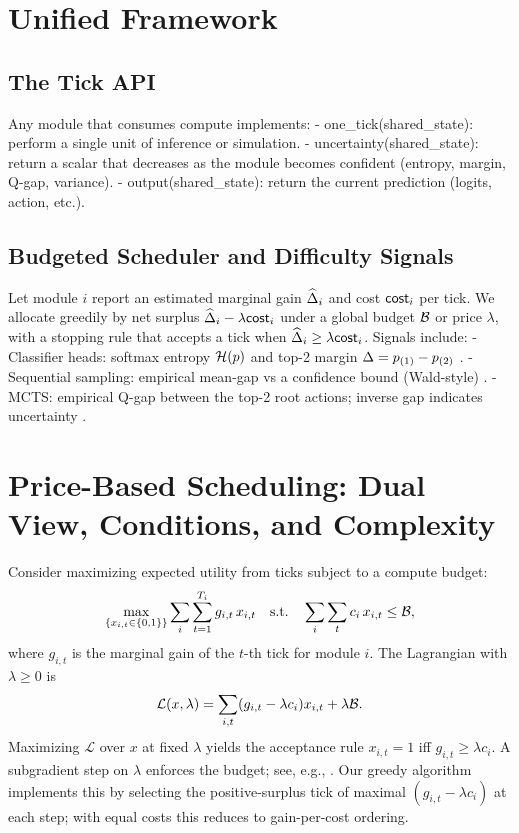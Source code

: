 \section{Unified Framework}
\label{sec:framework}
\subsection{The Tick API}
Any module that consumes compute implements:
- one\_tick(shared\_state): perform a single unit of inference or simulation.
- uncertainty(shared\_state): return a scalar that decreases as the module becomes confident (entropy, margin, Q-gap, variance).
- output(shared\_state): return the current prediction (logits, action, etc.).

\subsection{Budgeted Scheduler and Difficulty Signals}
Let module $i$ report an estimated marginal gain $\widehat{\Delta}_i$ and cost $\mathsf{cost}_i$ per tick. We allocate greedily by net surplus $\widehat{\Delta}_i-\lambda\mathsf{cost}_i$ under a global budget $\mathcal{B}$ or price $\lambda$, with a stopping rule that accepts a tick when $\widehat{\Delta}_i \ge \lambda \mathsf{cost}_i$. Signals include:
- Classifier heads: softmax entropy $\mathcal{H}(p)$ and top-2 margin $\Delta = p_{(1)}-p_{(2)}$ \cite{Kaya2019ShallowDeep,Guo2017Calibration}.
- Sequential sampling: empirical mean-gap vs a confidence bound (Wald-style) \cite{Wald1945Sequential,Hoeffding1963}.
- MCTS: empirical Q-gap between the top-2 root actions; inverse gap indicates uncertainty \cite{Kocsis2006UCT,Coulom2006MCTS}.

\section{Price-Based Scheduling: Dual View, Conditions, and Complexity}
\label{sec:dual}
Consider maximizing expected utility from ticks subject to a compute budget:
\[
\max_{\{x_{i,t}\in\{0,1\}\}} \sum_{i} \sum_{t=1}^{T_i} g_{i,t} \, x_{i,t}
\quad\text{s.t.}\quad \sum_{i} \sum_{t} c_i \, x_{i,t} \le \mathcal{B},
\]
where $g_{i,t}$ is the marginal gain of the $t$-th tick for module $i$. The Lagrangian with $\lambda\ge 0$ is
\[
\mathcal{L}(x,\lambda) = \sum_{i,t} (g_{i,t}-\lambda c_i) x_{i,t} + \lambda \mathcal{B}.
\]
Maximizing $\mathcal{L}$ over $x$ at fixed $\lambda$ yields the acceptance rule $x_{i,t}=1$ iff $g_{i,t} \ge \lambda c_i$. A subgradient step on $\lambda$ enforces the budget; see, e.g., \cite{BoydVandenberghe2004}. Our greedy algorithm implements this by selecting the positive-surplus tick of maximal $(g_{i,t}-\lambda c_i)$ at each step; with equal costs this reduces to gain-per-cost ordering.

